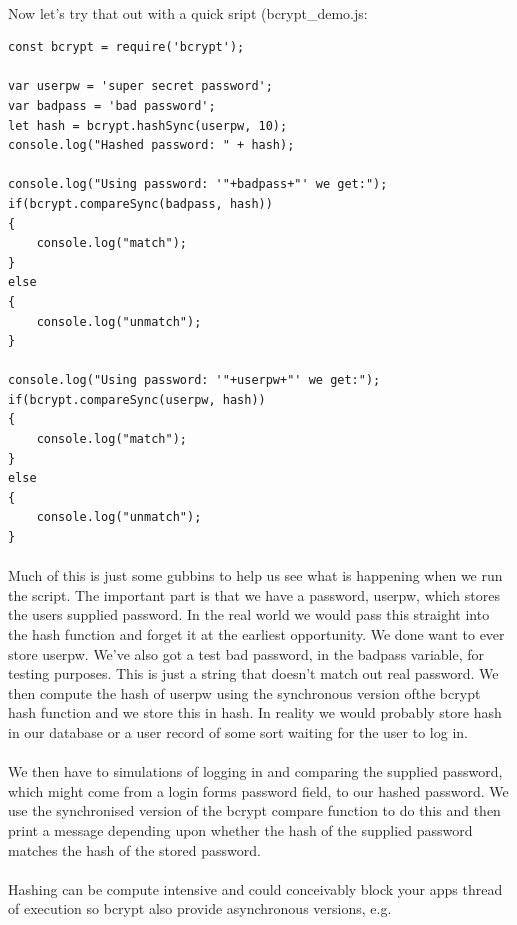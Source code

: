 \documentclass[10pt, a4paper, twosize]{article}
\begin{document}
\paragraph{} Now let's try that out with a quick sript (bcrypt\_demo.js:
\begin{lstlisting}
const bcrypt = require('bcrypt');

var userpw = 'super secret password';
var badpass = 'bad password';
let hash = bcrypt.hashSync(userpw, 10);
console.log("Hashed password: " + hash);

console.log("Using password: '"+badpass+"' we get:");
if(bcrypt.compareSync(badpass, hash))
{
    console.log("match");
}
else
{
    console.log("unmatch");
}

console.log("Using password: '"+userpw+"' we get:");
if(bcrypt.compareSync(userpw, hash))
{
    console.log("match");
}
else
{
    console.log("unmatch");
}

\end{lstlisting}
\paragraph{} Much of this is just some gubbins to help us see what is happening when we run the script. The important part is that we have a password, userpw, which stores the users supplied password. In the real world we would pass this straight into the hash function and forget it at the earliest opportunity. We done want to ever store userpw. We've also got a test bad password, in the badpass variable, for testing purposes. This is just a string that doesn't match out real password. We then compute the hash of userpw using the synchronous version ofthe bcrypt hash function and we store this in hash. In reality we would probably store hash in our database or a user record of some sort waiting for the user to log in.

\paragraph{} We then have to simulations of logging in and comparing the supplied password, which might come from a login forms password field, to our hashed password. We use the synchronised version of the bcrypt compare function to do this and then print a message depending upon whether the hash of the supplied password matches the hash of the stored password.

\paragraph{} Hashing can be compute intensive and could conceivably block your apps thread of execution so bcrypt also provide asynchronous versions, e.g.
\end{document}
